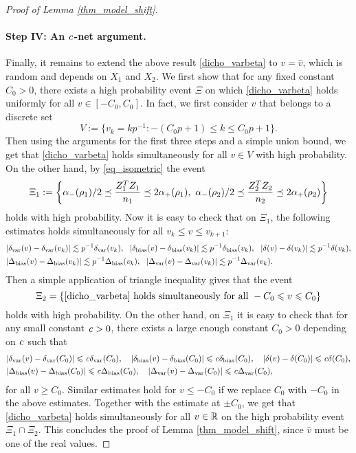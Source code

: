 \begin{proof}[Proof of Lemma \ref{thm_model_shift}]
\paragraph{Step IV: An $\e$-net argument.} Finally, it remains to extend the above result \eqref{dicho_varbeta} to $v=\hat v$, which is random and depends on $X_1$ and $X_2$. We first show that for any fixed constant $C_0>0$, there exists a high probability event $\Xi$ on which \eqref{dicho_varbeta} 
holds uniformly for all $v\in [-C_0, C_0]$. In fact, we first consider $v$ that belongs to a discrete set 
$$V:=\{v_k = kp^{-1}: -(C_0p +1)\le k \le C_0p +1\}.$$
Then using the arguments for the first three steps and a simple union bound, we get that
\eqref{dicho_varbeta} holds simultaneously for all $v\in V$ with high probability. On the other hand, by \eqref{eq_isometric} the event
$$\Xi_1:=\left\{ \al_-(\rho_1)/2 \preceq  \frac{Z_1^T Z_1}{n_1}  \preceq   2\al_+(\rho_1) ,\  \al_-(\rho_2)/2 \preceq  \frac{Z_2^T Z_2}{n_2}  \preceq   2\al_+(\rho_2)\right\}$$
holds with high probability. Now it is easy to check that on $\Xi_1$, the following estimates holds simultaneously for all $v_k \le v\le v_{k+1}$:
\begin{align*}
& |\delta_{\vari}(v) -\delta_{\vari}(v_k)|\lesssim p^{-1}\delta_{\vari}(v_k),\ \ |\delta_{\bias}(v) -\delta_{\bias}(v_k)|\lesssim p^{-1}\delta_{\bias}(v_k), \ \   |\delta(v)-\delta(v_k)|\lesssim p^{-1}\delta(v_k),\\
& |\Delta_{\bias}(v) -\Delta_{\bias}(v_k)|\lesssim p^{-1}\Delta_{\bias}(v_k),\ \ |\Delta_{\vari}(v) -\Delta_{\vari}(v_k)|\lesssim p^{-1}\Delta_{\vari}(v_k).
\end{align*}
Then a simple application of triangle inequality gives that the event 
$$\Xi_2=\{\eqref{dicho_varbeta} \text{ holds simultaneously for all }-C_0\le v \le C_0\}$$
holds with high probability. On the other hand, on $\Xi_1$ it is easy to check that for any small constant $\e>0$, there exists a large enough constant $C_0>0$ depending on $\e$ such that
\begin{align*}
& |\delta_{\vari}(v) -\delta_{\vari}(C_0)|\le \e\delta_{\vari}(C_0),\quad |\delta_{\bias}(v) -\delta_{\bias}(C_0)|\le \e\delta_{\bias}(C_0), \quad  |\delta(v)-\delta(C_0)|\le \e\delta(C_0),\\
& |\Delta_{\bias}(v) -\Delta_{\bias}(C_0)|\le \e\Delta_{\bias}(C_0),\quad |\Delta_{\vari}(v) -\Delta_{\vari}(C_0)|\le \e\Delta_{\vari}(C_0),
\end{align*}
for all $v\ge C_0$. Similar estimates hold for $v\le -C_0$ if we replace $C_0$ with $-C_0$ in the above estimates. Together with the estimate at $\pm C_0$, we get that \eqref{dicho_varbeta} holds simultaneously for all $v\in \R$ on the high probability event $\Xi_1\cap \Xi_2$. This concludes the proof of Lemma \ref{thm_model_shift}, since $\hat v$ must be one of the real values.
\end{proof}


